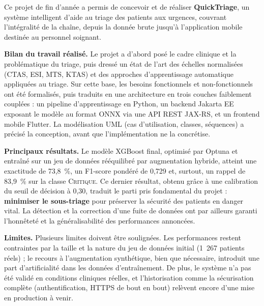 Ce projet de fin d'année a permis de concevoir et de réaliser \textbf{QuickTriage}, un système
intelligent d'aide au triage des patients aux urgences, couvrant l'intégralité de la chaîne, depuis
la donnée brute jusqu'à l'application mobile destinée au personnel soignant.

\medskip
\noindent\textbf{Bilan du travail réalisé.} Le projet a d'abord posé le cadre clinique et la
problématique du triage, puis dressé un état de l'art des échelles normalisées (CTAS, ESI, MTS,
KTAS) et des approches d'apprentissage automatique appliquées au triage. Sur cette base, les besoins
fonctionnels et non-fonctionnels ont été formalisés, puis traduits en une architecture en trois
couches faiblement couplées : un pipeline d'apprentissage en Python, un backend Jakarta EE exposant
le modèle au format ONNX via une API REST JAX-RS, et un frontend mobile Flutter. La modélisation UML
(cas d'utilisation, classes, séquences) a précisé la conception, avant que l'implémentation ne la
concrétise.

\medskip
\noindent\textbf{Principaux résultats.} Le modèle XGBoost final, optimisé par Optuna et entraîné sur
un jeu de données rééquilibré par augmentation hybride, atteint une exactitude de 73,8~\%, un
F1-score pondéré de 0,729 et, surtout, un rappel de 83,9~\% sur la classe \textsc{Critique}. Ce
dernier résultat, obtenu grâce à une calibration du seuil de décision à 0,30, traduit le parti pris
fondamental du projet : \textbf{minimiser le sous-triage} pour préserver la sécurité des patients en
danger vital. La détection et la correction d'une fuite de données ont par ailleurs garanti
l'honnêteté et la généralisabilité des performances annoncées.

\medskip
\noindent\textbf{Limites.} Plusieurs limites doivent être soulignées. Les performances restent
contraintes par la taille et la nature du jeu de données initial (1~267 patients réels) ; le recours
à l'augmentation synthétique, bien que nécessaire, introduit une part d'artificialité dans les
données d'entraînement. De plus, le système n'a pas été validé en conditions cliniques réelles, et
l'historisation comme la sécurisation complète (authentification, HTTPS de bout en bout) relèvent
encore d'une mise en production à venir.

